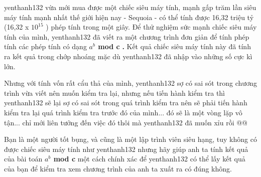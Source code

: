 yenthanh132     vừa mới mua được một chiếc siêu máy tính, mạnh gấp trăm lần siêu máy tính mạnh nhất thế giới hiện nay - Sequoia - có thể tính được 16,32 triệu tỷ (16,32 x $10^{15}$     ) phép tính trong một giây. Để thử nghiệm sức mạnh chiếc siêu máy tính của mình,    yenthanh132     đã viết ra một chương trình đơn giản để tính phép tính các phép tính có dạng    \textbf{      $a^{b}$      mod c     }\textbf{      .     }\textbf{}     Kết quả chiếc siêu máy tính này đã tính ra kết quả trong chớp nhoáng mặc dù    yenthanh132     đã nhập vào những số cực kì lớn.    



     Nhưng với tính vốn rất cẩu thả của mình,    yenthanh132     sợ có sai sót trong chương trình vừa viết nên muốn kiểm tra lại, nhưng nếu tiến hành kiểm tra thì    yenthanh132     sẽ lại sợ có sai sót trong quá trình kiểm tra nên sẽ phải tiến hành kiểm tra lại quá trình kiểm tra trước đó của mình... đó sẽ là một vòng lặp vô tận... chỉ mới liên tưởng đến việc đó thôi mà    yenthanh132     đã muốn xỉu rồi @@    



     Bạn là một người tốt bụng, và cũng là một lập trình viên siêu hạng, tuy không có được chiếc siêu máy tính như    yenthanh132     nhưng hãy giúp anh ta tính kết quả của bài toán    \textbf{      $a^{b}$      mod c     }     một cách chính xác để    yenthanh132     có thể lấy kết quả của bạn để kiểm tra xem chương trình của anh ta xuất ra có đúng không.